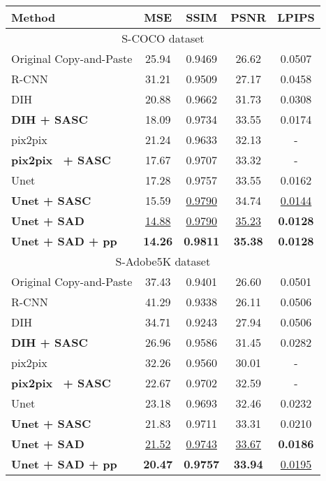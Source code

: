 \begin{table}[t!]
\begin{center}
\begin{tabular}{|l|c|c|c|c|}
\hline
Method & MSE & SSIM & PSNR  & LPIPS \\
\hline
\hline
\multicolumn{5}{|c|}{S-COCO dataset}  \\
\hline
Original Copy-and-Paste  & 25.94 & 0.9469 & 26.62 & 0.0507 \\
R-CNN \cite{Zhu:2015tl} & 31.21 &  0.9509 & 27.17 & 0.0458 \\
DIH~\cite{Tsai:2017kv}  &  20.88      &   0.9662     & 31.73 &  0.0308         \\
\textbf{DIH + SASC}  &   18.09      &  0.9734      & 33.55    &   0.0174   \\
pix2pix~\cite{Isola:2016tp}    &   21.24   & 0.9633 & 32.13     & - \\
\textbf{pix2pix~\cite{Isola:2016tp} + SASC}     &   17.67   & 0.9707 & 33.32  &   -  \\
Unet~\cite{Isola:2016tp}       & 17.28         & 0.9757          & 33.55 &        0.0162 \\
\textbf{Unet + SASC } & 15.59 & \underline{0.9790} & 34.74 & \underline{0.0144} \\
\textbf{Unet + SAD} & \underline{14.88} & \underline{0.9790} & \underline{35.23} & \textbf{0.0128} \\
\textbf{Unet + SAD + pp} & \textbf{14.26} & \textbf{0.9811} & \textbf{35.38} & \textbf{0.0128} \\
\hline
\hline
\multicolumn{5}{|c|}{S-Adobe5K dataset}  \\
\hline
Original Copy-and-Paste  & 37.43  & 0.9401 & 26.60 & 0.0501 \\
R-CNN~\cite{Zhu:2015tl}  & 41.29 & 0.9338 & 26.11 & 0.0506 \\
DIH\cite{Tsai:2017kv}  & 34.71 &  0.9243 & 27.94 & 0.0506 \\
\textbf{DIH + SASC}   & 26.96 & 0.9586 & 31.45  & 0.0282    \\
pix2pix~\cite{Isola:2016tp}      & 32.26       & 0.9560         & 30.01     &  - \\
\textbf{pix2pix~\cite{Isola:2016tp}  + SASC}     &  22.67         & 0.9702         & 32.59    &   - \\
Unet~\cite{Isola:2016tp}   &     23.18 & 0.9693 & 32.46 & 0.0232   \\
\textbf{Unet + SASC}  & 21.83 & 0.9711 & 33.31 & 0.0210 \\
\textbf{Unet + SAD} & \underline{21.52} & \underline{0.9743} & \underline{33.67} & \textbf{0.0186} \\
\textbf{Unet + SAD + pp} & \textbf{20.47} & \textbf{0.9757} & \textbf{33.94} & \underline{0.0195} \\
\hline
\end{tabular}
\end{center}


\end{table}
